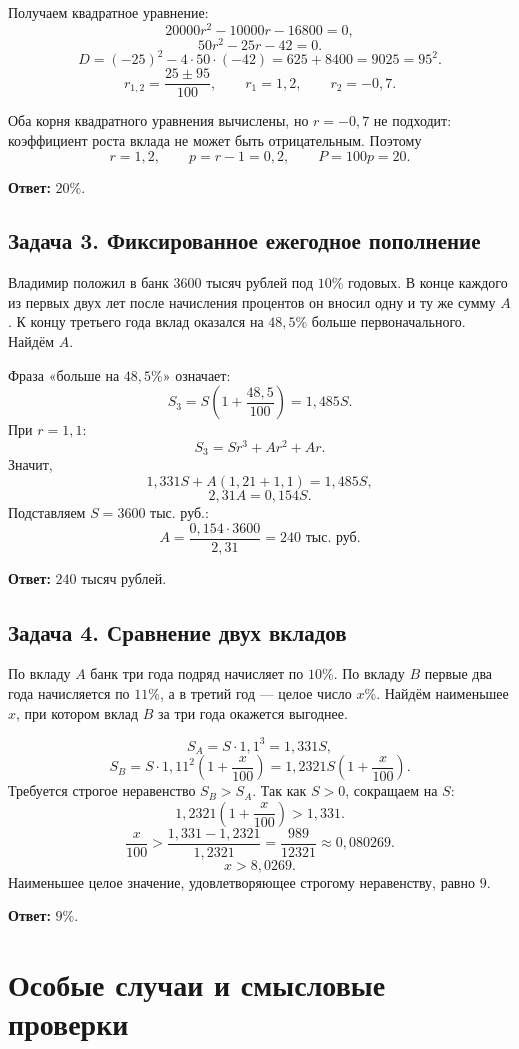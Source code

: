\documentclass[a4paper,12pt]{article}
\newcommand{\term}[1]{\textcolor{darkaccent}{\textbf{#1}}}
\begin{document}
Получаем квадратное уравнение:
\[
20000r^2-10000r-16800=0,
\]
\[
50r^2-25r-42=0.
\]
\[
D=(-25)^2-4\cdot50\cdot(-42)=625+8400=9025=95^2.
\]
\[
r_{1,2}=\frac{25\pm95}{100},\qquad
r_1=1{,}2,\qquad r_2=-0{,}7.
\]

Оба корня квадратного уравнения вычислены, но $r=-0{,}7$ не подходит:
коэффициент роста вклада не может быть отрицательным. Поэтому
\[
r=1{,}2,\qquad p=r-1=0{,}2,\qquad P=100p=20.
\]

\term{Ответ:} $20\%$.

\subsection{Задача 3. Фиксированное ежегодное пополнение}

Владимир положил в банк $3600$ тысяч рублей под $10\%$ годовых. В конце
каждого из первых двух лет после начисления процентов он вносил одну и ту же
сумму $A$. К концу третьего года вклад оказался на $48{,}5\%$ больше
первоначального. Найдём $A$.

Фраза «больше на $48{,}5\%$» означает:
\[
S_3=S\left(1+\frac{48{,}5}{100}\right)=1{,}485S.
\]
При $r=1{,}1$:
\[
S_3=Sr^3+Ar^2+Ar.
\]
Значит,
\[
1{,}331S+A(1{,}21+1{,}1)=1{,}485S,
\]
\[
2{,}31A=0{,}154S.
\]
Подставляем $S=3600$ тыс. руб.:
\[
A=\frac{0{,}154\cdot3600}{2{,}31}=240\text{ тыс. руб.}
\]

\term{Ответ:} $240$ тысяч рублей.

\subsection{Задача 4. Сравнение двух вкладов}

По вкладу $A$ банк три года подряд начисляет по $10\%$. По вкладу $B$
первые два года начисляется по $11\%$, а в третий год --- целое число $x\%$.
Найдём наименьшее $x$, при котором вклад $B$ за три года окажется выгоднее.

\[
S_A=S\cdot1{,}1^3=1{,}331S,
\]
\[
S_B=S\cdot1{,}11^2\left(1+\frac{x}{100}\right)
=1{,}2321S\left(1+\frac{x}{100}\right).
\]
Требуется строгое неравенство $S_B>S_A$. Так как $S>0$, сокращаем на $S$:
\[
1{,}2321\left(1+\frac{x}{100}\right)>1{,}331.
\]
\[
\frac{x}{100}>
\frac{1{,}331-1{,}2321}{1{,}2321}
=\frac{989}{12321}\approx0{,}080269.
\]
\[
x>8{,}0269.
\]
Наименьшее целое значение, удовлетворяющее строгому неравенству, равно $9$.

\term{Ответ:} $9\%$.

\section{Особые случаи и смысловые проверки}
\end{document}
